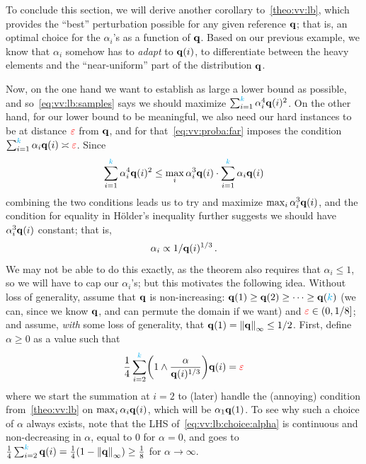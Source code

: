 To conclude this section, we will derive another corollary to~\cref{theo:vv:lb}, which provides the ``best'' perturbation possible for any given reference $\mathbf{q}$; that is, an optimal choice for the $\alpha_i$'s as a function of $\mathbf{q}$. Based on our previous example, we know that $\alpha_i$ somehow has to \emph{adapt} to $\mathbf{q}(i)$, to differentiate between the heavy elements and the ``near-uniform'' part of the distribution $\mathbf{q}$.

Now, on the one hand we want to establish as large a lower bound as possible, and so~\cref{eq:vv:lb:samples} says we should maximize
$
\sum_{i=1}^{\textcolor{cyan}{k}} \alpha_i^4\mathbf{q}(i)^2
$. On the other hand, for our lower bound to be meaningful, we also need our hard instances to be at distance $\textcolor{red}{\varepsilon}$ from $\mathbf{q}$, and for that~\cref{eq:vv:proba:far} imposes the condition
$
\sum_{i=1}^{\textcolor{cyan}{k}} \alpha_i\mathbf{q}(i) \asymp \textcolor{red}{\varepsilon}
$. Since
\begin{equation}
	\sum_{i=1}^{\textcolor{cyan}{k}} \alpha_i^4\mathbf{q}(i)^2 \leq \max_i \alpha_i^3\mathbf{q}(i) \cdot \sum_{i=1}^{\textcolor{cyan}{k}} \alpha_i\mathbf{q}(i)
\end{equation}
combining the two conditions leads us to try and maximize $\max_i \alpha_i^3\mathbf{q}(i)$, and the condition for equality in H\"older's inequality further suggests we should have $\alpha_i^3\mathbf{q}(i)$ constant; that is,
\begin{equation}
	\label{eq:vv:lb:intuition}
	\alpha_i \propto 1/\mathbf{q}(i)^{1/3}\,.
\end{equation}
We may not be able to do this exactly, as the theorem also requires that $\alpha_i \leq 1$, so we will have to cap our $\alpha_i$'s;  but this motivates the following idea. Without loss of generality, assume that $\mathbf{q}$ is non-increasing: $\mathbf{q}(1)\geq \mathbf{q}(2)\geq \dots\geq \mathbf{q}({\textcolor{cyan}{k}})$ (we can, since we know $\mathbf{q}$, and can permute the domain if we want) and $\textcolor{red}{\varepsilon}\in(0,1/8]$; and assume, \emph{with} some loss of generality, that $\q(1)=\norminf{\q} \leq 1/2$. First, define $\alpha\geq 0$ as a value such that
\begin{equation}
	\label{eq:vv:lb:choice:alpha}
	\frac{1}{4}\sum_{i=2}^\ab \Paren{1\land \frac{\alpha}{\q(i)^{1/3}}}\q(i) = \dst
\end{equation}
where we start the summation at $i=2$ to (later) handle the (annoying) condition from~\cref{theo:vv:lb} on $\max_i \alpha_i\mathbf{q}(i)$, which will be $\alpha_1\mathbf{q}(1)$. To see why such a choice of $\alpha$ always exists, note that 
the LHS of~\cref{eq:vv:lb:choice:alpha} is continuous and non-decreasing in $\alpha$, equal to $0$ for $\alpha=0$, and goes to $\frac{1}{4}\sum_{i=2}^\ab \q(i) = \frac{1}{4}(1-\norminf{\q}) \geq \frac{1}{8}$ for $\alpha\to\infty$.

